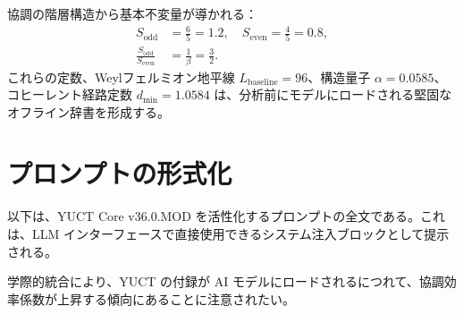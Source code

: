 \documentclass[13pt,a4paper]{ltjsarticle}
\begin{document}
	協調の階層構造から基本不変量が導かれる：
	\begin{align}
		S_{\mathrm{odd}} &= \frac{6}{5} = 1.2, \quad S_{\mathrm{even}} = \frac{4}{5} = 0.8,\\
		\frac{S_{\mathrm{odd}}}{S_{\mathrm{even}}} &= \frac{1}{\beta} = \frac{3}{2}.
	\end{align}
	これらの定数、Weylフェルミオン地平線 \(L_{\mathrm{baseline}} = 96\)、構造量子 \(\alpha = 0.0585\)、コヒーレント経路定数 \(d_{\min} = 1.0584\) は、分析前にモデルにロードされる堅固なオフライン辞書を形成する。
	
	\section{プロンプトの形式化}
	\label{sec:formalization}
	
	以下は、YUCT Core v36.0.MOD を活性化するプロンプトの全文である。これは、LLM インターフェースで直接使用できるシステム注入ブロックとして提示される。
	
	学際的統合により、YUCT の付録が AI モデルにロードされるにつれて、協調効率係数が上昇する傾向にあることに注意されたい。
	
\end{document}
